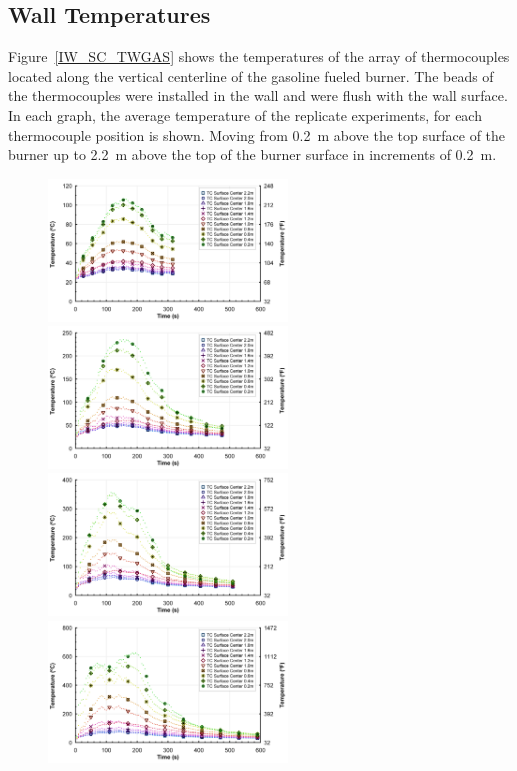\documentclass[twoside]{uocthesis}
\begin{document}
{{\subsection{Wall Temperatures}



Figure~\ref{IW_SC_TWGAS} shows the temperatures of the array of thermocouples located along the vertical centerline of the gasoline fueled burner.  The beads of the thermocouples were installed in the wall and were flush with the wall surface. In each graph, the average temperature of the replicate experiments, for each thermocouple position is shown.  Moving from 0.2~m above the top surface of the burner up to 2.2~m above the top of the burner surface in increments of 0.2~m.

\begin{figure}[p]
	\centering
	\includegraphics[width=2.5in]{../Figures/TC_Surface_Center_TWGas_0_61m_RepsAvg}
	\includegraphics[width=2.5in]{../Figures/TC_Surface_Center_TWGas_0_31m_RepsAvg}\\
	\includegraphics[width=2.5in]{../Figures/TC_Surface_Center_TWGas_0_15m_RepsAvg}
	\includegraphics[width=2.5in]{../Figures/TC_Surface_Center_TWGas_0m_RepsAvg}\\

\end{figure}}}
\end{document}
